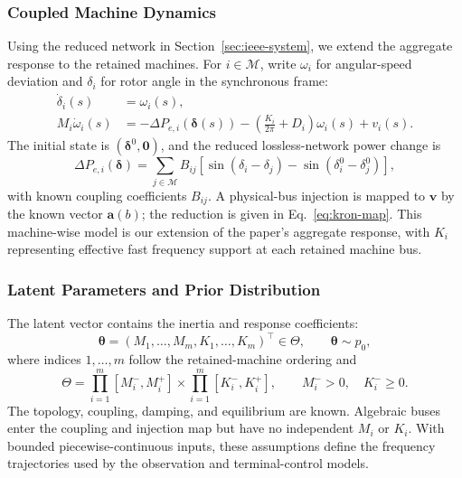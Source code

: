 \documentclass[journal]{IEEEtran}
\begin{document}
\subsubsection{Coupled Machine Dynamics}
Using the reduced network in Section~\ref{sec:ieee-system}, we extend the
aggregate response to the retained machines. For $i\in\mathcal M$, write $\omega_i$ for angular-speed
deviation and $\delta_i$ for rotor angle in the synchronous frame:
\begin{align}
\dot\delta_i(s)&=\omega_i(s),\\
M_i\dot\omega_i(s)&=-\Delta P_{e,i}(\boldsymbol\delta(s))
-\left(\frac{K_i}{2\pi}+D_i\right)\omega_i(s)+v_i(s).
\label{eq:swing-frequency}
\end{align}
The initial state is $(\boldsymbol\delta^0,\mathbf0)$, and the reduced
lossless-network power change is
\begin{equation}
\Delta P_{e,i}(\boldsymbol\delta)=\sum_{j\in\mathcal M}B_{ij}
\left[\sin(\delta_i-\delta_j)-\sin(\delta_i^0-\delta_j^0)\right],
\label{eq:network-power}
\end{equation}
with known coupling coefficients $B_{ij}$. A physical-bus injection is
mapped to $\mathbf v$ by the known vector $\mathbf a(b)$; the reduction is
given in Eq.~\eqref{eq:kron-map}. This machine-wise model is our extension
of the paper's aggregate response, with $K_i$ representing effective fast
frequency support at each retained machine bus.

\subsubsection{Latent Parameters and Prior Distribution}
The latent vector contains the inertia and response coefficients:
\begin{equation}
\boldsymbol\theta=(M_1,\ldots,M_m,K_1,\ldots,K_m)^\top\in\Theta,
\qquad\boldsymbol\theta\sim p_0,
\label{eq:theta-prior}
\end{equation}
where indices $1,\ldots,m$ follow the retained-machine ordering and
\begin{equation}
\Theta=\prod_{i=1}^{m}[M_i^-,M_i^+]
\times\prod_{i=1}^{m}[K_i^-,K_i^+],
\qquad M_i^->0,\quad K_i^-\ge0.
\label{eq:latent-space}
\end{equation}
The topology, coupling, damping, and equilibrium are known. Algebraic buses
enter the coupling and injection map but have no independent $M_i$ or $K_i$.
With bounded piecewise-continuous inputs, these assumptions define the
frequency trajectories used by the observation and terminal-control models.
\end{document}
